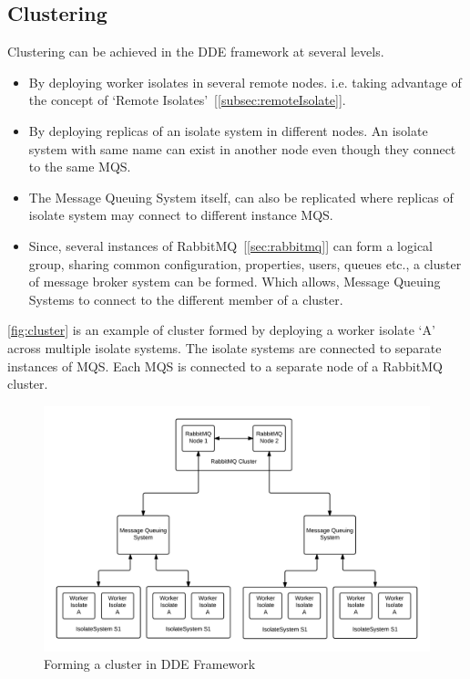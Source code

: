 \subsection{Clustering}
  Clustering can be achieved in the DDE framework at several levels.
  \begin{itemize}
  \item By deploying worker isolates in several remote nodes. i.e. taking advantage of the concept of ‘Remote Isolates’~[\autoref{subsec:remoteIsolate}].
  \item By deploying replicas of an isolate system in different nodes. An isolate system with same name can exist in another node even though they connect to the same MQS.
  \item The Message Queuing System itself, can also be replicated where replicas of isolate system may connect to different instance MQS.
  \item Since, several instances of RabbitMQ~[\autoref{sec:rabbitmq}] can form a logical group, sharing common configuration, properties, users, queues etc., a cluster of message broker system can be formed. Which allows, Message Queuing Systems to connect to the different member of a cluster.
  \end{itemize}

  \autoref{fig:cluster} is an example of cluster formed by deploying a worker isolate ‘A’ across multiple isolate systems. The isolate systems are connected to separate instances of MQS. Each MQS is connected to a separate node of a RabbitMQ cluster.

\begin{figure}[H]
  \centering
  \includegraphics[width=1\textwidth]{figures/cluster}
  \caption[Forming a cluster in DDE Framework]{Forming a cluster in DDE Framework}
  \label{fig:cluster}
\end{figure}

